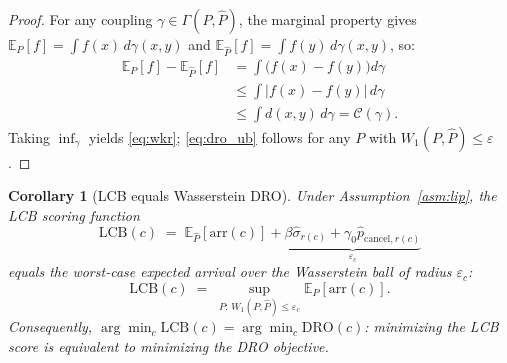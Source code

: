 \documentclass[11pt]{article}
\newtheorem{corollary}[theorem]{Corollary}
\theoremstyle{definition}
\theoremstyle{remark}
\begin{document}
\begin{proof}
For any coupling $\gamma \in \Gamma(P,\hat{P})$, the marginal property gives
$\mathbb{E}_P[f] = \int f(x)\,d\gamma(x,y)$ and
$\mathbb{E}_{\hat{P}}[f] = \int f(y)\,d\gamma(x,y)$, so:
\begin{align*}
\mathbb{E}_P[f] - \mathbb{E}_{\hat{P}}[f]
&= \int\bigl(f(x)-f(y)\bigr)d\gamma \\
&\leq \int |f(x)-f(y)|\,d\gamma \\
&\leq \int d(x,y)\,d\gamma
= \mathcal{C}(\gamma).
\end{align*}
Taking $\inf_\gamma$ yields \eqref{eq:wkr};
\eqref{eq:dro_ub} follows for any $P$ with $W_1(P,\hat P)\le\varepsilon$.
\end{proof}

\begin{corollary}[LCB equals Wasserstein DRO]\label{cor:lcb_dro}
Under Assumption~\ref{asm:lip}, the LCB scoring function
\[
\mathrm{LCB}(c) \;=\;
\mathbb{E}_{\hat{P}}[\mathrm{arr}(c)] + \underbrace{\beta\hat\sigma_{r(c)} + \gamma_0\hat{p}_{\mathrm{cancel},r(c)}}_{\varepsilon_c}
\]
equals the worst-case expected arrival over the Wasserstein ball of radius $\varepsilon_c$:
\[
\mathrm{LCB}(c) \;=\;
\sup_{P:\,W_1(P,\hat{P})\leq\varepsilon_c}\mathbb{E}_P[\mathrm{arr}(c)].
\]
Consequently, $\arg\min_c \mathrm{LCB}(c) = \arg\min_c \mathrm{DRO}(c)$:
\emph{minimizing the LCB score is equivalent to minimizing the DRO objective.}
\end{corollary}
\end{document}
